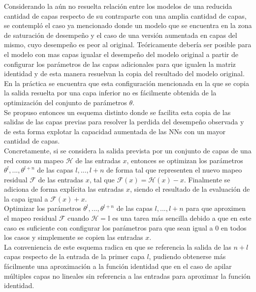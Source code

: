 \documentclass{article}
\begin{document}
	Considerando la aún no resuelta relación entre los modelos de una reducida cantidad de capas respecto de su contraparte con una amplia cantidad de capas, se contempló el caso ya mencionado donde un modelo que se encuentra en la zona de saturación de desempeño y el caso de una versión aumentada en capas del mismo, cuyo desempeño es peor al original. Teóricamente debería ser posible para el modelo con mas capas igualar el desempeño del modelo original a partir de configurar los parámetros de las capas adicionales para que igualen la matriz identidad y de esta manera resuelvan la copia del resultado del modelo original. En la práctica se encuentra que esta configuración mencionada en la que se copia la salida resuelta por una capa inferior no es fácilmente obtenida de la optimización del conjunto de parámetros $\theta$\cite{28ResidualLearning}.\\
	
	Se propuso entonces un esquema distinto donde se facilita esta copia de las salidas de las capas previas para resolver la perdida del desempeño observada y de esta forma explotar la capacidad aumentada de las NNs con un mayor cantidad de capas.\\
	Concretamente, si se considera la salida prevista por un conjunto de capas de una red como un mapeo $\mathcal{H}$ de las entradas $x$, entonces se optimizan los parámetros $\theta^l, ... , \theta^{l+n}$ de las capas $l, ... , l+n$ de forma tal que representen el nuevo mapeo residual $\mathcal{F}$ de las entradas $x$, tal que $\mathcal{F}(x) = \mathcal{H}(x) - x$. Finalmente se adiciona de forma explícita las entradas $x$, siendo el resultado de la evaluación de la capa igual a $\mathcal{F}(x) + x$.\\
	Optimizar los parámetros $\theta^l, ... , \theta^{l+n}$ de las capas $l, ... , l+n$ para que aproximen el mapeo residual $\mathcal{F}$ cuando $\mathcal{H} = \mathbb{I}$ es una tarea más sencilla debido a que en este caso es suficiente con configurar los parámetros para que sean igual a $0$ en todos los casos y simplemente se copien las entradas $x$\cite{28ResidualLearning}.\\
	La conveniencia de este esquema radica en que se referencia la salida de las $n+l$ capas respecto de la entrada de la primer capa $l$, pudiendo obtenerse más fácilmente una aproximación a la función identidad que en el caso de apilar múltiples capas no lineales sin referencia a las entradas para aproximar la función identidad.\\
	
\end{document}
